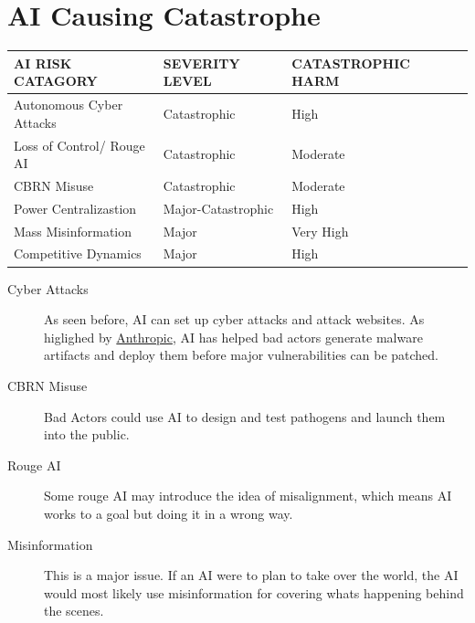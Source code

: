 \documentclass{report}
\begin{document}
	\section{AI Causing Catastrophe}
	\begin{table}[h!]
		\centering
		\begin{tabular}{llll}
			\hline
			\textbf{AI RISK CATAGORY} & \textbf{SEVERITY LEVEL} & \textbf{CATASTROPHIC HARM} & \textbf{} \\ \hline
			Autonomous Cyber Attacks  & Catastrophic       & High      &  \\ \hline
			Loss of Control/ Rouge AI & Catastrophic       & Moderate  &  \\ \hline
			CBRN Misuse               & Catastrophic       & Moderate  &  \\ \hline
			Power Centralizastion     & Major-Catastrophic & High      &  \\ \hline
			Mass Misinformation       & Major              & Very High &  \\ \hline
			Competitive Dynamics      & Major              & High      &  \\ \hline
		\end{tabular}
	\end{table}
	
	\begin{description}
		\item[Cyber Attacks] As seen before, AI can set up cyber attacks and attack websites. As higlighed by \href{https://www.anthropic.com/threat-intelligence-report-september-2026}{Anthropic}, AI has helped bad actors generate malware artifacts and deploy them before major vulnerabilities can be patched.
		\item[CBRN Misuse] Bad Actors could use AI to design and test pathogens and launch them into the public.
		\item[Rouge AI] Some rouge AI may introduce the idea of misalignment, which means AI works to a goal but doing it in a wrong way. 
		\item[Misinformation] This is a major issue. If an AI were to plan to take over the world, the AI would most likely use misinformation for covering whats happening behind the scenes.
	\end{description}
	
\end{document}
